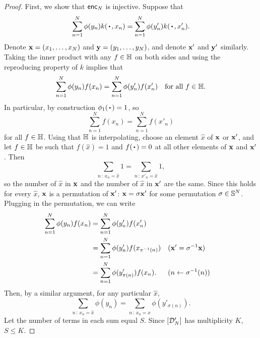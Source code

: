 \documentclass[12pt, twoside]{report}
\begin{document}
\begin{proof}
    First, we show that $\mathsf{enc}_N$ is injective.
    Suppose that
    \begin{equation}
        \sum_{n=1}^N \phi(y_n) k(\vardot, x_n)
        = \sum_{n=1}^{N} \phi(y'_n) k(\vardot, x'_n).
    \end{equation}
    Denote $\mathbf{x} = (x_1, \ldots, x_N)$ and $\mathbf{y} = (y_1, \ldots, y_N)$, and denote $\mathbf{x}'$ and $\mathbf{y}'$ similarly.
    Taking the inner product with any $f \in \mathbb{H}$ on both sides and using the reproducing property of $k$ implies that
    \begin{equation}
        \sum_{n=1}^N \phi(y_n) f(x_n) = \sum_{n=1}^{N} \phi(y'_n) f(x'_n)
        \quad
        \text{for all $f \in \mathbb{H}$}.
    \end{equation}
    In particular, by construction $\phi_1(\vardot) = 1$, so
    \begin{equation}
        \sum_{n=1}^N f(x_n) = \sum_{n=1}^{N} f(x'_n)
    \end{equation}
    for all $f \in \mathbb{H}$.
    Using that $\mathbb{H}$ is interpolating, choose an element $\hat x$ of $\mathbf{x}$ or $\mathbf{x}'$, and let $f \in \mathbb{H}$ be such that $f(\hat x) = 1$ and $f(\vardot) = 0$ at all other elements of $\mathbf{x}$ and $\mathbf{x}'$.
    Then
    \begin{equation}
        \sum_{n\,:\,x_n = \hat x} 1
        = \sum_{n\,:\,x'_n = \hat x} 1,
    \end{equation}
    so the number of $\hat x$ in $\mathbf{x}$ and the number of $\hat x$ in $\mathbf{x}'$ are the same.
    Since this holds for every $\hat x$, $\mathbf{x}$ is a permutation of $\mathbf{x}'$: $\mathbf{x} = \sigma \mathbf{x}'$ for some permutation $\sigma \in \mathbb{S}^N$.
    Plugging in the permutation, we can write 
    \begin{align}
        \sum_{n=1}^N \phi(y_n) f(x_n)
        &= \sum_{n=1}^{N} \phi(y'_n) f(x'_n) \\
        &= \sum_{n=1}^{N} \phi(y'_n) f(x_{\pi^{-1}(n)}) && \text{$(\mathbf{x}' = \sigma^{-1}\mathbf{x})$} \\
        &= \sum_{n=1}^{N} \phi(y'_{\pi(n)}) f(x_{n}). && \text{$(n \gets \sigma^{-1}(n))$}
    \end{align}
    Then, by a similar argument, for any particular $\hat x$, 
    \begin{equation} \label{eq:injectivity_phi}
        \sum_{n\,:\,x_n = \hat x} \phi(y_n)
        = \sum_{n\,:\,x_n = \hat x} \phi(y'_{\sigma(n)}).
    \end{equation}
    Let the number of terms in each sum equal $S$.
    Since $[\mathcal{D}_{N}']$ has multiplicity $K$, $S \leq K$.

\end{proof}
\end{document}
